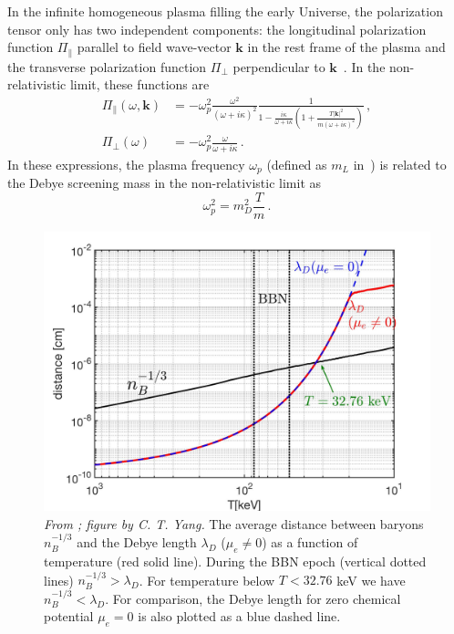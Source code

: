 In the infinite homogeneous plasma filling the early Universe, the polarization tensor only has two independent components: the longitudinal polarization function $\Pi_{\parallel}$ parallel to field wave-vector $\boldsymbol{k}$ in the rest frame of the plasma and the transverse polarization function $\Pi_{\perp}$ perpendicular to $\boldsymbol{k}$~\citep{melrose2008quantum}. In the non-relativistic limit, these functions are~\citep{Formanek:2021blc}
\begin{align}\label{eq:polfuncs}
	\Pi_\parallel(\omega,\boldsymbol{k}) &= -\omega_p^2\frac{\omega^2}{(\omega+ i \kappa)^2} \frac{1}{1-\frac{i\kappa}{\omega+ i \kappa}\left(1+\frac{ T |\boldsymbol{k}|^2}{m (\omega+ i \kappa)^2} \right)}\,,\\
	\Pi_{\perp}(\omega) &= -\omega_p^2 \frac{\omega}{\omega+ i \kappa}\,.
\end{align}
In these expressions, the plasma frequency $\omega_p$ (defined as $m_L$ in~\cite{Formanek:2021blc}) is related to the Debye screening mass in the non-relativistic limit as
\begin{equation}\label{eq:plasmafreq}
 \omega_p^2 = m_D^2\frac{T}{m}\,.
\end{equation}

\begin{figure}[ht]
\begin{center}
\includegraphics[width=0.95\linewidth]{plots/chap03BBN/Distance_Plasma002.jpg}
\caption{\textit{From \cite{Grayson:2023flr}; figure by C. T. Yang.} The average distance between baryons $n_B^{-1/3}$ and the Debye length $\lambda_D$ ($\mu_e \neq 0$) as a function of temperature (red solid line). During the BBN epoch (vertical dotted lines) $n_B^{-1/3}>\lambda_D$. For temperature below $T<32.76$ keV we have $n_B^{-1/3}<\lambda_D$. For comparison, the Debye length for zero chemical potential $\mu_e=0$ is also plotted as a blue dashed line.}
\label{MeanFreePath_fig}
\end{center}
\end{figure}

